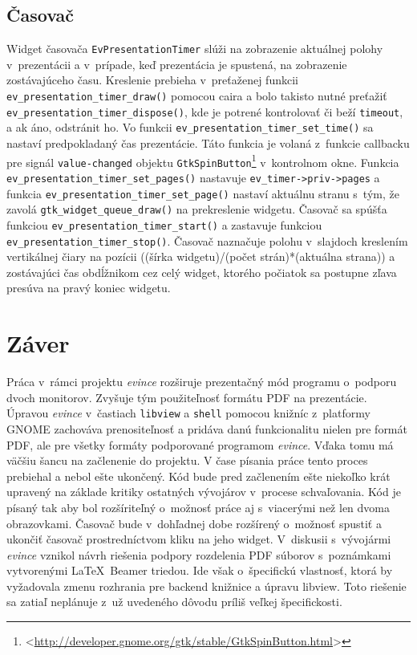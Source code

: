 \documentclass[12pt,oneside,final]{fithesis2}
\begin{document}
\section{Časovač}
Widget časovača \texttt{EvPresentationTimer} slúži na zobrazenie aktuálnej polohy v~prezentácii a v~prípade, keď prezentácia je spustená, na zobrazenie zostávajúceho času. Kreslenie prebieha v~preťaženej funkcii  \texttt{ev\_\-presentation\_\-timer\_\-draw()} pomocou caira a bolo takisto nutné preťažiť \texttt{ev\_\-presentation\_\-timer\_\-dispose()}, kde je potrené kontrolovať či beží \texttt{timeout}, a ak áno, odstránit ho. Vo funkcii \texttt{ev\_\-presentation\_\-timer\_\-set\_\-time()} sa nastaví predpokladaný čas prezentácie. Táto funkcia je volaná z~funkcie callbacku pre signál \texttt{value-changed} objektu \texttt{GtkSpinButton}\footnote{<\url{http://developer.gnome.org/gtk/stable/GtkSpinButton.html}>} v~kontrolnom okne. Funkcia \texttt{ev\_\-presentation\_\-timer\_\-set\_\-pages()} nastavuje \texttt{ev\_\-timer->priv->pages} a funkcia \texttt{ev\_\-presentation\_\-timer\_\-set\_\-page()} nastaví aktuálnu stranu s~tým, že zavolá \texttt{gtk\_\-widget\_\-queue\_\-draw()} na prekreslenie widgetu. Časovač sa spúšťa funkciou \texttt{ev\_\-presentation\_\-timer\_\-start()} a zastavuje funkciou \texttt{ev\_\-presentation\_\-timer\_\-stop()}. Časovač naznačuje polohu v~slajdoch kreslením vertikálnej čiary na pozícii ((šírka widgetu)/(počet strán)*(aktuálna strana)) a zostávajúci čas obdĺžnikom cez celý widget, ktorého počiatok sa postupne zľava presúva na pravý koniec widgetu.

\chapter{Záver}
Práca v~rámci projektu \emph{evince} rozširuje prezentačný mód programu o~podporu dvoch monitorov. Zvyšuje tým použiteľnosť formátu PDF na prezentácie. Úpravou \emph{evince} v~častiach \texttt{libview} a \texttt{shell} pomocou knižníc z~platformy GNOME zachováva prenositeľnosť a pridáva danú funkcionalitu nielen pre formát PDF, ale pre všetky formáty podporované programom \emph{evince}. Vďaka tomu má väčšiu šancu na začlenenie do projektu. V čase písania práce tento proces prebiehal a nebol ešte ukončený. Kód bude pred začlenením ešte niekoľko krát upravený na základe kritiky ostatných vývojárov v~procese schvaľovania. Kód je písaný tak aby bol rozšíriteľný o~možnosť práce aj s~viacerými než len dvoma obrazovkami. Časovač bude v~dohľadnej dobe rozšírený o~možnosť spustiť a ukončiť časovač prostredníctvom kliku na jeho widget. V~diskusii s~vývojármi \emph{evince} vznikol návrh riešenia podpory rozdelenia PDF súborov s~poznámkami vytvorenými \LaTeX~Beamer triedou. Ide však o~špecifickú vlastnosť, ktorá by vyžadovala zmenu rozhrania pre backend knižnice a úpravu libview. Toto riešenie sa zatiaľ neplánuje z~už uvedeného dôvodu príliš veľkej špecifickosti.
\end{document}
